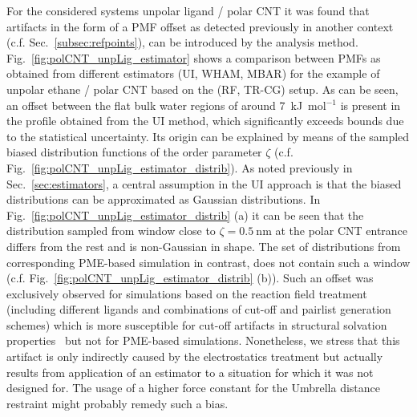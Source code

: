 \documentclass[9pt,lessons]{livecoms}
\begin{document}
For the considered systems unpolar ligand / polar CNT it was found that artifacts in the form of a PMF offset as detected previously in another context (c.f. Sec.~\ref{subsec:refpoints}), can be introduced by the analysis method. 
Fig.~\ref{fig:polCNT_unpLig_estimator} shows a comparison between PMFs as obtained from different estimators (UI, WHAM, MBAR) for the example of unpolar ethane / polar CNT based on the (RF, TR-CG) setup.
As can be seen, an offset between the flat bulk water regions of around 7~kJ~mol$^{-1}$ is present in the profile obtained from the UI method, which significantly exceeds bounds due to the statistical uncertainty.
Its origin can be explained by means of the sampled biased distribution functions of the order parameter $\zeta$ 
(c.f. Fig.~\ref{fig:polCNT_unpLig_estimator_distrib}). 
As noted previously in Sec.~\ref{sec:estimators}, a central assumption in the UI approach is that the biased distributions can be approximated as Gaussian distributions.
In Fig.~\ref{fig:polCNT_unpLig_estimator_distrib} (a) it can be seen that the distribution sampled from window close to $\zeta =0.5~\mathrm{nm}$ at the polar CNT entrance differs from the rest and is non-Gaussian in shape.
The set of distributions from corresponding PME-based simulation in contrast, does not contain such a window (c.f. Fig.~\ref{fig:polCNT_unpLig_estimator_distrib} (b)).
Such an offset was exclusively observed for simulations based on the reaction field treatment (including different ligands and combinations of cut-off and pairlist generation schemes) 
which is more susceptible for cut-off artifacts in structural solvation properties~\cite{reif2011computation} 
but not for PME-based simulations.
Nonetheless, we stress that this artifact is only indirectly caused by the electrostatics treatment but actually results from application of an estimator to a situation for which it was not designed for.
The usage of a higher force constant for the Umbrella distance restraint might probably remedy such a bias.
\end{document}
